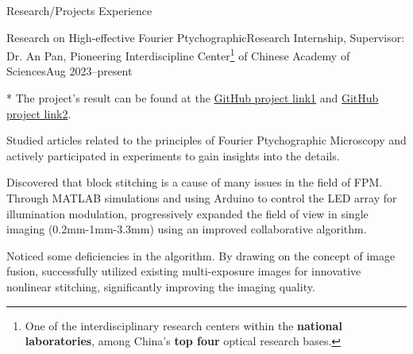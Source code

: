 \documentclass[]{kyvernitis-resume}
\begin{document}
\begin{section}{\Large Research/Projects Experience}



    \begin{subsection}{Research on High-effective Fourier Ptychographic}{Research Internship, Supervisor: Dr. An Pan, Pioneering Interdiscipline Center\footnote{One of the interdisciplinary research centers within the \textbf{national laboratories}, among China's \textbf{top four} optical research bases.}
 of Chinese Academy of Sciences}{Aug 2023--present}{}
     \item[*] The project's result can be found at the \href{https://wang-zhiping.github.io/ResearchSummary&Reporting/FPM/single-fast.html}{GitHub project link1} and  \href{https://wang-zhiping.github.io/ResearchSummary&Reporting/FPM/fusion.html}{GitHub project link2}.
     \item Studied articles related to the principles of Fourier Ptychographic Microscopy and actively participated in experiments to gain insights into the details.
     \item Discovered that block stitching is a cause of many issues in the field of FPM. Through MATLAB simulations and using Arduino to control the LED array for illumination modulation, progressively expanded the field of view in single imaging (0.2mm-1mm-3.3mm) using an improved collaborative algorithm.
     \item Noticed some deficiencies in the algorithm. By drawing on the concept of image fusion, successfully utilized existing multi-exposure images for innovative nonlinear stitching, significantly improving the imaging quality.

     

    
    \end{subsection}



\end{section}
\end{document}
